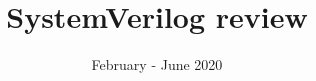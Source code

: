 \documentclass[]{slides}
\title{SystemVerilog review}
\date{February - June 2020}
\begin{document}
\begin{frame} \titlepage \end{frame}



\end{document}
